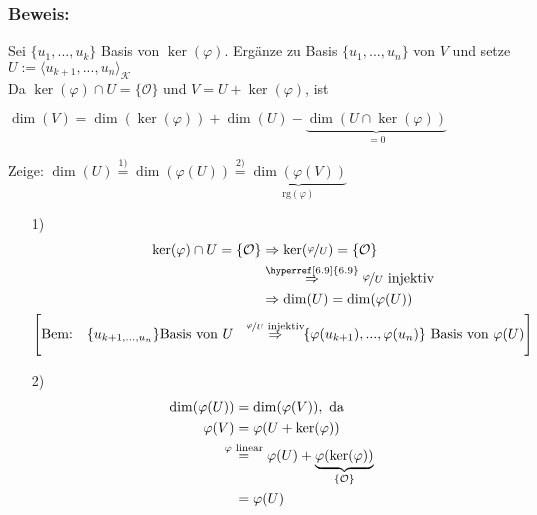 \documentclass[a4paper, 12pt,titlepage, pdf, headsepline]{article}
\newcommand{\K}{\mathcal{K}}
\newcommand{\rg}{\textrm{rg}}
\newcommand{\vecspace}[2]{\langle#1\rangle_{#2}}
\renewcommand{\>}{\rightarrow}
\renewcommand{\*}{\cdot}
\renewcommand{\O}{\mathcal{O}}
\renewcommand{\phi}{\varphi}
\begin{document}
		      			\subsubsection*{Beweis:}
                                        Sei $\{u_1, ..., u_k\}$ Basis von $\ker(\phi)$. Ergänze zu Basis $\{u_1,...,u_n\}$ von $V$ und setze $U := \vecspace{u_{k+1},...,u_n}{\K}$\\
                                        Da $\ker(\phi) \cap U = \{\O\}
		      			$ und $V = U + \ker(\phi)$, ist 
		      			\begin{center}
                                                $\dim(V) = \dim(\ker(\phi)) + \dim(U) - \underbrace{\dim(U \cap \ker(\phi))}_{= 0}$
		      			\end{center}
		      			Zeige: $\dim(U) \overset{1)}{=} \dim(\phi(U)) \overset{2)}{=} \underbrace{\dim(\phi(V))}_{\rg(\phi)}$\\
		      			\begin{itemize}
		      				\item[1)] \begin{align*}
		      				      \ker(\phi) \cap U= \{\O\} &\Rightarrow \ker(\nicefrac{\phi}{U}) = \{\O\}\\
		      				      &\overset{\hyperref[6.9]{6.9}}{\Rightarrow} \nicefrac{\phi}{U} \text{ injektiv}\\
		      				      &\Rightarrow \dim(U) = \dim(\phi(U))\\
		      				      \Bigg[\text{Bem:}~~~ \{u_{k+1,...,u_n}\} \text{Basis von }U~~~~~~ &~~~\mathclap{\overset{\nicefrac{\phi}{U}{\text{ injektiv}}}{\Rightarrow}}~~~~~~ \{\phi(u_{k+1}),...,\phi(u_n)\} \text{ Basis von }\phi(U)\Bigg]
		      				\end{align*}
		      				\item[2)]
		      				      \begin{align*}
		      				      	\dim(\phi(U)) & = \dim(\phi(V)), \text{ da}                                                                                     \\
		      				      	\phi(V)       & = \phi(U + \ker(\phi))                                                                                          \\
		      				      	              & ~~\mathclap{\overset{\phi \textrm{ linear}}{=}}~~ ~~~\phi(U) + \underbrace{\phi (\ker(\phi))}_{\{\mathcal{O}\}} \\
		      				      	              & = \phi(U)                                                                                                       
		      				      \end{align*}
		      			\end{itemize}
\end{document}
